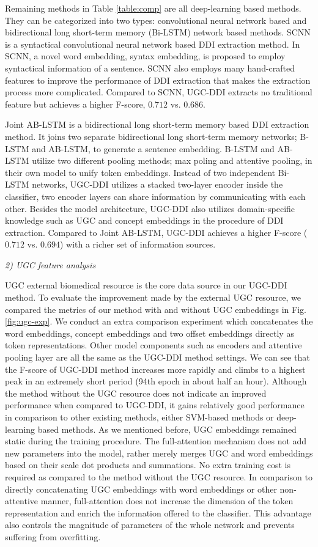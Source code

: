 \documentclass[conference]{IEEEtran}
\begin{document}
Remaining methods in Table \ref{table:comp} are all deep-learning based methods.
They can be categorized into two types: convolutional neural network based and bidirectional long short-term memory (Bi-LSTM) network based methods.
SCNN \cite{zhao_drug_2016} is a syntactical convolutional neural network based DDI extraction method.
In SCNN, a novel word embedding, syntax embedding, is proposed to employ syntactical information of a sentence.
SCNN also employs many hand-crafted features to improve the performance of DDI extraction that makes the extraction process more complicated.
Compared to SCNN, UGC-DDI extracts no traditional feature but achieves a higher F-score, $0.712$ vs. $0.686$.

Joint AB-LSTM is a bidirectional long short-term memory based DDI extraction method.
It joins two separate bidirectional long short-term memory networks; B-LSTM and AB-LSTM, to generate a sentence embedding.
B-LSTM and AB-LSTM utilize two different pooling methods; max poling and attentive pooling, in their own model to unify token embeddings.
Instead of two independent Bi-LSTM networks, UGC-DDI utilizes a stacked two-layer encoder inside the classifier,
two encoder layers can share information by communicating with each other.
Besides the model architecture, UGC-DDI also utilizes domain-specific knowledge such as UGC and concept embeddings in the procedure of DDI extraction.
Compared to Joint AB-LSTM, UGC-DDI achieves a higher F-score ($0.712$ vs. $0.694$) with a richer set of information sources.

\bigbreak
\emph{2) UGC feature analysis}
\bigbreak

UGC external biomedical resource is the core data source in our UGC-DDI method.
To evaluate the improvement made by the external UGC resource, we compared the metrics of our method
with and without UGC embeddings in Fig. \ref{fig:ugc-exp}.
We conduct an extra comparison experiment which concatenates the word embeddings, concept embeddings and two offset embeddings directly as token representations.
Other model components such as encoders and attentive pooling layer are all the same as the UGC-DDI method settings.
We can see that the F-score of UGC-DDI method increases more rapidly and climbs to a highest peak in an extremely short period (94th epoch in about half an hour).
Although the method without the UGC resource does not indicate an improved performance when compared to UGC-DDI,
it gains relatively good performance in comparison to other existing methods, either SVM-based methods or deep-learning based methods.
As we mentioned before, UGC embeddings remained static during the training procedure.
The full-attention mechanism does not add new parameters into the model, rather merely merges UGC and word embeddings based on their
scale dot products and summations.
No extra training cost is required as compared to the method without the UGC resource.
In comparison to directly concatenating UGC embeddings with word embeddings or other non-attentive manner,
full-attention does not increase the dimension of the token representation and enrich the information offered to the classifier.
This advantage also controls the magnitude of parameters of the whole network and prevents suffering from overfitting.
\end{document}

